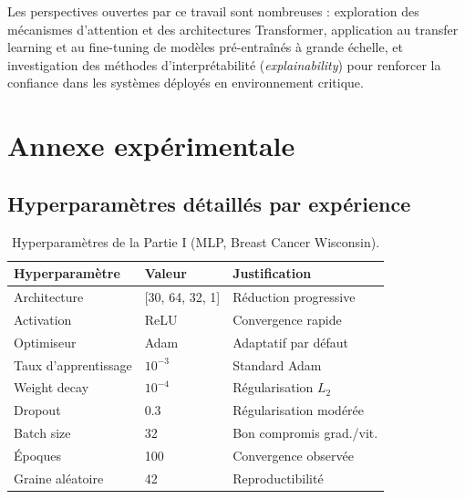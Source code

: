 \documentclass[11pt,a4paper]{article}
\begin{document}
Les perspectives ouvertes par ce travail sont nombreuses : exploration des mécanismes
d'attention et des architectures Transformer, application au transfer learning et au
fine-tuning de modèles pré-entraînés à grande échelle, et investigation des méthodes
d'interprétabilité (\textit{explainability}) pour renforcer la confiance dans les
systèmes déployés en environnement critique.

\appendix
\section{Annexe expérimentale}

\subsection{Hyperparamètres détaillés par expérience}

\begin{table}[H]
  \centering
  \caption{Hyperparamètres de la Partie I (MLP, Breast Cancer Wisconsin).}
  \label{tab:hp_mlp}
  \begin{tabular}{lll}
    \toprule
    \textbf{Hyperparamètre} & \textbf{Valeur} & \textbf{Justification} \\
    \midrule
    Architecture            & [30, 64, 32, 1]    & Réduction progressive    \\
    Activation              & ReLU               & Convergence rapide       \\
    Optimiseur              & Adam               & Adaptatif par défaut     \\
    Taux d'apprentissage    & $10^{-3}$          & Standard Adam            \\
    Weight decay            & $10^{-4}$          & Régularisation $L_2$     \\
    Dropout                 & 0.3                & Régularisation modérée   \\
    Batch size              & 32                 & Bon compromis grad./vit. \\
    Époques                 & 100                & Convergence observée     \\
    Graine aléatoire        & 42                 & Reproductibilité         \\
    \bottomrule
  \end{tabular}
\end{table}
\end{document}
